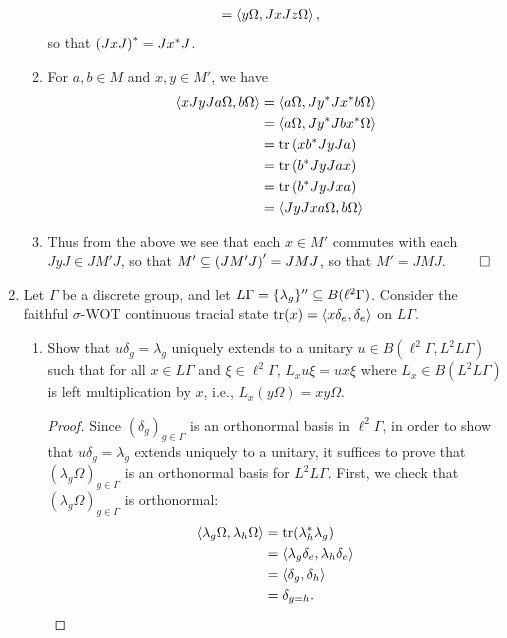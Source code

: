 \documentclass[a4paper,10pt]{report}
\newcommand{\ggen}[1]{\langle#1\rangle}
\DeclarePairedDelimiter{\set}{\{}{\}}
\begin{document}
\begin{enumerate}
\begin{enumerate}
\begin{align*}
                    &= \left\langle y \Omega , J x J z \Omega \right\rangle,
                  \end{align*}
                  so that $\left( J x J \right)^* = J x^* J$.
                \item For $a , b \in M$ and $x , y \in M'$, we have
                  \begin{align*}
                    \ET x J y J a \Omega , b \Omega \TE%
                    &= \ET a \Omega , J y^* J x^* b \Omega \TE\\
                    &= \ET a \Omega , J y^* J b x^* \Omega \TE\\
                    &= \tr \E x b^* J y J a \R\\
                    &= \tr \E b^* J y J a x \R\\
                    &= \tr \E b^* J y J x a \R\\
                    &= \ET J y J x a \Omega , b \Omega \TE
                  \end{align*}


                \item Thus from the above we see that each $x \in M'$ commutes with each $J y J \in J M' J$, so that $M' \subseteq \left( J M' J \right)' = J M J$, so that $M' = J M J$. \hfill $\qed$


		\end{enumerate}
		\newpage
 \item 
 Let $\Gamma$ be a discrete group, and let $L\Gamma = \set{\lambda_g}'' \subseteq B(\ell^2\Gamma)$.
 Consider the faithful $\sigma$-WOT continuous tracial state
 $\tr(x) = \ggen{x\delta_e, \delta_e}$ on $L\Gamma$.
		\begin{enumerate}
			\item Show that $u\delta_g = \lambda_g$ uniquely extends to a unitary
				$u \in B(\ell^2\Gamma, L^2L\Gamma)$ such that for all $x \in L\Gamma$
				and $\xi \in \ell^2\Gamma$, $L_xu\xi = ux\xi$ where $L_x \in B(L^2L\Gamma)$
				is left multiplication by $x$, i.e., $L_x(y\Omega) = xy\Omega$.
				\begin{proof}
					Since $(\delta_g)_{g \in \Gamma}$ is an orthonormal basis in $\ell^2\Gamma$,
					in order to show that $u\delta_g = \lambda_g$ extends uniquely to a unitary,
					it suffices to prove that $(\lambda_g\Omega)_{g \in \Gamma}$ is an
					orthonormal basis for $L^2L\Gamma$.
					First, we check that $(\lambda_g\Omega)_{g \in \Gamma}$ is orthonormal:
					\begin{align*}
						\ggen{\lambda_g\Omega, \lambda_h\Omega}
						 & = \tr(\lambda_h^*\lambda_g) \\
						 & = \ggen{\lambda_g\delta_e, \lambda_h\delta_e} \\
						 & = \ggen{\delta_g, \delta_h} \\
						 & = \delta_{g = h}.
					\end{align*}
					

\end{proof}
\end{enumerate}
\end{enumerate}
\end{document}
